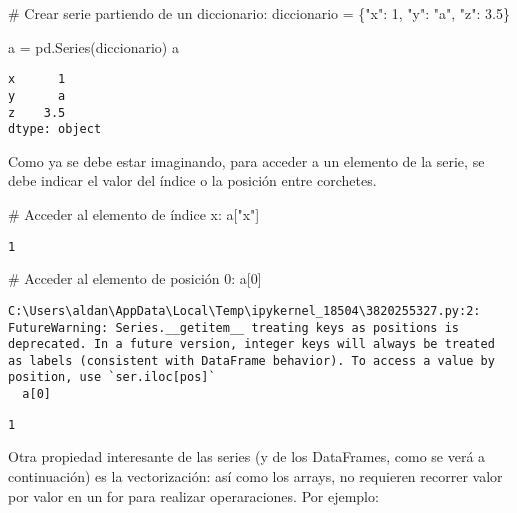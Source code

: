 \documentclass[
  letterpaper,
  DIV=11,
  numbers=noendperiod]{scrreprt}
\newenvironment{Shaded}{\begin{snugshade}}{\end{snugshade}}
\newcommand{\CommentTok}[1]{\textcolor[rgb]{0.37,0.37,0.37}{#1}}
\newcommand{\DecValTok}[1]{\textcolor[rgb]{0.68,0.00,0.00}{#1}}
\newcommand{\FloatTok}[1]{\textcolor[rgb]{0.68,0.00,0.00}{#1}}
\newcommand{\NormalTok}[1]{\textcolor[rgb]{0.00,0.23,0.31}{#1}}
\newcommand{\OperatorTok}[1]{\textcolor[rgb]{0.37,0.37,0.37}{#1}}
\newcommand{\StringTok}[1]{\textcolor[rgb]{0.13,0.47,0.30}{#1}}
\begin{document}
\begin{Shaded}
\begin{Highlighting}[]
\CommentTok{\# Crear serie partiendo de un diccionario:}
\NormalTok{diccionario }\OperatorTok{=}\NormalTok{ \{}\StringTok{"x"}\NormalTok{: }\DecValTok{1}\NormalTok{, }\StringTok{"y"}\NormalTok{: }\StringTok{"a"}\NormalTok{, }\StringTok{"z"}\NormalTok{: }\FloatTok{3.5}\NormalTok{\}}

\NormalTok{a }\OperatorTok{=}\NormalTok{ pd.Series(diccionario)}
\NormalTok{a}
\end{Highlighting}
\end{Shaded}

\begin{verbatim}
x      1
y      a
z    3.5
dtype: object
\end{verbatim}

Como ya se debe estar imaginando, para acceder a un elemento de la
serie, se debe indicar el valor del índice o la posición entre
corchetes.

\begin{Shaded}
\begin{Highlighting}[]
\CommentTok{\# Acceder al elemento de índice x:}
\NormalTok{a[}\StringTok{"x"}\NormalTok{]}
\end{Highlighting}
\end{Shaded}

\begin{verbatim}
1
\end{verbatim}

\begin{Shaded}
\begin{Highlighting}[]
\CommentTok{\# Acceder al elemento de posición 0:}
\NormalTok{a[}\DecValTok{0}\NormalTok{]}
\end{Highlighting}
\end{Shaded}

\begin{verbatim}
C:\Users\aldan\AppData\Local\Temp\ipykernel_18504\3820255327.py:2: FutureWarning: Series.__getitem__ treating keys as positions is deprecated. In a future version, integer keys will always be treated as labels (consistent with DataFrame behavior). To access a value by position, use `ser.iloc[pos]`
  a[0]
\end{verbatim}

\begin{verbatim}
1
\end{verbatim}

Otra propiedad interesante de las series (y de los DataFrames, como se
verá a continuación) es la vectorización: así como los arrays, no
requieren recorrer valor por valor en un for para realizar
operaraciones. Por ejemplo:
\end{document}
